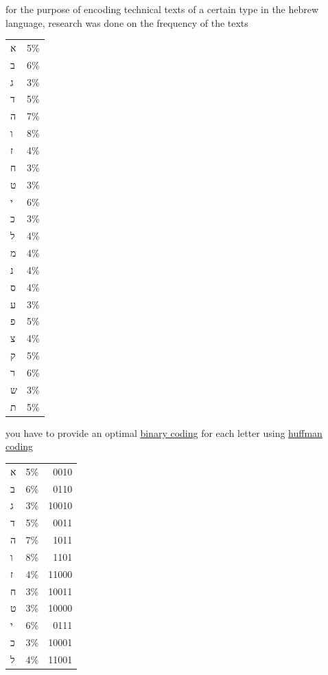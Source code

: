 \documentclass[a4paper,12pt]{article}
\newcommand{\?}{\stackrel{?}{=}}
\begin{document}
\begin{question}
for the purpose of encoding technical texts of a certain type in the hebrew language, research was done on the frequency of the texts\\[0pt]
\begin{tabular}{ll}
א & 5\%\\[0pt]
ב & 6\%\\[0pt]
ג & 3\%\\[0pt]
ד & 5\%\\[0pt]
ה & 7\%\\[0pt]
ו & 8\%\\[0pt]
ז & 4\%\\[0pt]
ח & 3\%\\[0pt]
ט & 3\%\\[0pt]
י & 6\%\\[0pt]
כ & 3\%\\[0pt]
ל & 4\%\\[0pt]
מ & 4\%\\[0pt]
נ & 4\%\\[0pt]
ס & 4\%\\[0pt]
ע & 3\%\\[0pt]
פ & 5\%\\[0pt]
צ & 4\%\\[0pt]
ק & 5\%\\[0pt]
ר & 6\%\\[0pt]
ש & 3\%\\[0pt]
ת & 5\%\\[0pt]
\end{tabular}
you have to provide an optimal \href{20230119160930-binary_coding.org}{binary coding} for each letter using \href{20230119155506-huffman_coding.org}{huffman coding}\\[0pt]
\begin{answer}
\begin{tabular}{llr}
א & 5\% & 0010\\[0pt]
ב & 6\% & 0110\\[0pt]
ג & 3\% & 10010\\[0pt]
ד & 5\% & 0011\\[0pt]
ה & 7\% & 1011\\[0pt]
ו & 8\% & 1101\\[0pt]
ז & 4\% & 11000\\[0pt]
ח & 3\% & 10011\\[0pt]
ט & 3\% & 10000\\[0pt]
י & 6\% & 0111\\[0pt]
כ & 3\% & 10001\\[0pt]
ל & 4\% & 11001\\[0pt]

\end{tabular}
\end{answer}
\end{question}
\end{document}
